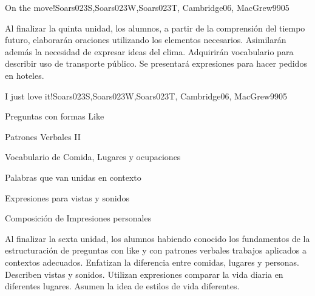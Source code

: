 \begin{syllabus}
\begin{unit}{On the move!}{Soars023S,Soars023W,Soars023T, Cambridge06, MacGrew99}{0}{5}
   \begin{learningoutcomes}
      \item Al finalizar la quinta unidad, los alumnos, a partir de la comprensión del tiempo futuro, elaborarán oraciones utilizando los elementos necesarios. Asimilarán además la necesidad de expresar ideas del clima. Adquirirán vocabulario para describir uso de transporte público. Se presentará expresiones para hacer pedidos en hoteles.
   \end{learningoutcomes}

\end{unit}

\begin{unit}{I just love it!}{Soars023S,Soars023W,Soars023T, Cambridge06, MacGrew99}{0}{5}
   \begin{topics}
      \item Preguntas con formas Like
      \item Patrones Verbales II
      \item Vocabulario de Comida, Lugares y ocupaciones
      \item Palabras que van unidas en contexto
      \item Expresiones para vistas y sonidos
      \item Composición de Impresiones personales
   \end{topics}

   \begin{learningoutcomes}
      \item Al finalizar la sexta unidad, los alumnos habiendo conocido los fundamentos de la estructuración de preguntas con like y con patrones verbales trabajos aplicados a contextos adecuados. Enfatizan la diferencia entre comidas, lugares y personas. Describen vistas y sonidos. Utilizan expresiones comparar la vida diaria en diferentes lugares. Asumen la idea de estilos de vida diferentes.
   \end{learningoutcomes}
\end{unit}



\begin{coursebibliography}
\end{coursebibliography}

\end{syllabus}
